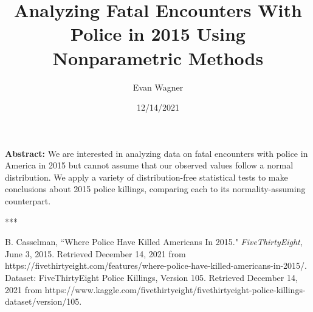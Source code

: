 \documentclass[12pt]{article}
\title{Analyzing Fatal Encounters With Police in 2015 Using Nonparametric Methods}
\author{Evan Wagner}
\date{12/14/2021}
\begin{document}
\maketitle

\par \noindent \textbf{Abstract:} We are interested in analyzing data on fatal encounters with police in America in 2015 but cannot assume that our observed values follow a normal distribution. We apply a variety of distribution-free statistical tests to make conclusions about 2015 police killings, comparing each to its normality-assuming counterpart.

\begin{center}
    ***
\end{center}

\tableofcontents









\begin{thebibliography}{99}
     B. Casselman, ``Where Police Have Killed Americans In 2015." \textit{FiveThirtyEight}, June 3, 2015. Retrieved December 14, 2021 from https://fivethirtyeight.com/features/where-police-have-killed-americans-in-2015/. Dataset: FiveThirtyEight Police Killings, Version 105. Retrieved December 14, 2021 from https://www.kaggle.com/fivethirtyeight/fivethirtyeight-police-killings-dataset/version/105.
\end{thebibliography}
\end{document}
